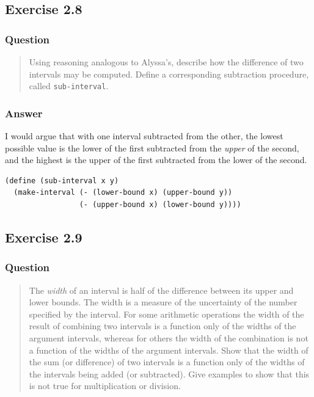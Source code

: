\documentclass[final,fleqn,titlepage,twoside]{article}
\begin{document}
\subsection{Exercise 2.8}
\label{sec:org703b972}
\subsubsection{Question}
\label{sec:org313040a}
\begin{quote}
Using reasoning analogous to Alyssa's, describe how the difference of two
intervals may be computed. Define a corresponding subtraction procedure, called
\texttt{sub-interval}.
\end{quote}

\subsubsection{Answer}
\label{sec:orga61e776}
I would argue that with one interval subtracted from the other, the lowest
possible value is the lower of the first subtracted from the \emph{upper} of the
second, and the highest is the upper of the first subtracted from the lower of
the second.
\begin{verbatim}
(define (sub-interval x y)
  (make-interval (- (lower-bound x) (upper-bound y))
                 (- (upper-bound x) (lower-bound y))))
\end{verbatim}

\subsection{Exercise 2.9}
\label{sec:orgddc14d5}
\subsubsection{Question}
\label{sec:org43ca822}
\begin{quote}
The \emph{width} of an interval is half of the difference between its upper and lower
bounds. The width is a measure of the uncertainty of the number specified by the
interval. For some arithmetic operations the width of the result of combining
two intervals is a function only of the widths of the argument intervals,
whereas for others the width of the combination is not a function of the widths
of the argument intervals. Show that the width of the sum (or difference) of two
intervals is a function only of the widths of the intervals being added (or
subtracted). Give examples to show that this is not true for multiplication or
division.
\end{quote}
\end{document}
